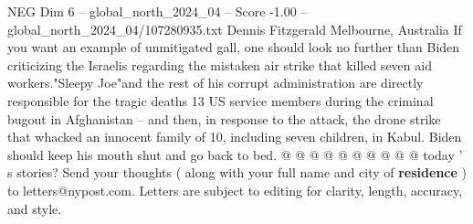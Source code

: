 \begin{textsample}{NEG Dim 6 – global\_north\_2024\_04 – Score -1.00 – global\_north\_2024\_04/107280935.txt}
Dennis Fitzgerald Melbourne, Australia If you want an example of unmitigated gall, one should look no further than Biden criticizing the Israelis regarding the mistaken air strike that killed seven aid workers."Sleepy Joe"and the rest of his corrupt administration are directly responsible for the tragic deaths 13 US service members during the criminal bugout in Afghanistan -- and then, in response to the attack, the drone strike that whacked an innocent family of 10, including seven children, in Kabul.
Biden should keep his mouth shut and go back to bed. @ @ @ @ @ @ @ @ @ @ today ' s stories?
Send your thoughts ( along with your full name and city of \textbf{residence} ) to letters@nypost.com.
Letters are subject to editing for clarity, length, accuracy, and style.

\end{textsample}
